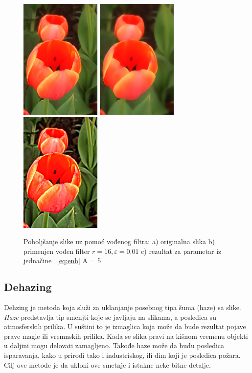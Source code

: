 \documentclass[a4paper,12pt,titlepage]{article}
\begin{document}
\begin{figure}[ht!]
\centering
\includegraphics[width=40mm]{img/flower.png}
\includegraphics[width=40mm]{img/flowerEGF.png}
\includegraphics[width=40mm]{img/flowerER.png}
\caption{Poboljšanje slike uz pomoć vođenog filtra: a) originalna slika b) primenjen vođen filter $r = 16, \varepsilon = 0.01$ c) rezultat za parametar iz jednačine ~\ref{eq:enh} A = 5 }
\label{overflow}
\end{figure}

\subsection{Dehazing}%

Dehzing je metoda koja služi za uklanjanje posebnog tipa šuma (haze) sa slike. \emph{Haze} predstavlja tip smenjti koje se javljaju na slikama, a posledica su atmosferskih prilika. U suštini to je izmaglica koja može da bude rezultat pojave prave magle ili vremnskih prilika. Kada se slika pravi na kišnom vremenu objekti u daljini mogu delovati zamagljeno. Takođe haze može da budu posledica isparavanja, kako u prirodi tako i industriskog, ili dim koji je posledica požara. Cilj ove metode je da ukloni ove smetnje i istakne neke bitne detalje.
\end{document}
